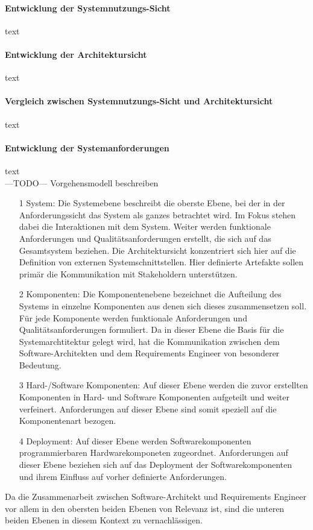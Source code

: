 \paragraph{Entwicklung der Systemnutzungs-Sicht}
text\\

\paragraph{Entwicklung der Architektursicht}
text\\

\paragraph{Vergleich zwischen Systemnutzungs-Sicht und Architektursicht}
text\\

\paragraph{Entwicklung der Systemanforderungen}
text\\

---TODO--- Vorgehensmodell beschreiben\\

\begin{itemize}
\item[1] System: Die Systemebene beschreibt die oberste Ebene, bei der in der Anforderungssicht das System als ganzes betrachtet wird. Im Fokus stehen dabei die Interaktionen mit dem System. Weiter werden funktionale Anforderungen und Qualitätsanforderungen erstellt, die sich auf das Gesamtsystem beziehen. Die Architektursicht konzentriert sich hier auf die Definition von externen Systemschnittstellen. Hier definierte Artefakte sollen primär die Kommunikation mit Stakeholdern unterstützen.
\item[2] Komponenten: Die Komponentenebene bezeichnet die Aufteilung des Systems in einzelne Komponenten aus denen sich dieses zusammensetzen soll. Für jede Komponente werden funktionale Anforderungen und Qualitätsanforderungen formuliert. Da in dieser Ebene die Basis für die Systemarchtitektur gelegt wird, hat die Kommunikation zwischen dem Software-Architekten und dem Requirements Engineer von besonderer Bedeutung. 
\item[3] Hard-/Software Komponenten: Auf dieser Ebene werden die zuvor erstellten Komponenten in Hard- und Software Komponenten aufgeteilt und weiter verfeinert. Anforderungen auf dieser Ebene sind somit speziell auf die Komponentenart bezogen. 
\item[4] Deployment: Auf dieser Ebene werden Softwarekomponenten programmierbaren Hardwarekomponeten zugeordnet. Anforderungen auf dieser Ebene beziehen sich auf das Deployment der Softwarekomponenten und ihrem Einfluss auf vorher definierte Anforderungen. 
\end{itemize}
Da die Zusammenarbeit zwischen Software-Architekt und Requirements Engineer vor allem in den obersten beiden Ebenen von Relevanz ist, sind die unteren beiden Ebenen in diesem Kontext zu vernachlässigen.\\

